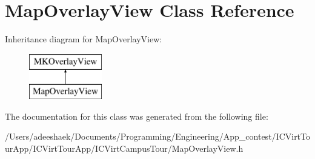 \hypertarget{interface_map_overlay_view}{\section{Map\-Overlay\-View Class Reference}
\label{interface_map_overlay_view}
}
Inheritance diagram for Map\-Overlay\-View\-:\begin{figure}[H]
\begin{center}
\leavevmode
\includegraphics[height=2.000000cm]{interface_map_overlay_view}
\end{center}
\end{figure}


The documentation for this class was generated from the following file\-:\begin{DoxyCompactItemize}
\item 
/\-Users/adeeshaek/\-Documents/\-Programming/\-Engineering/\-App\-\_\-contest/\-I\-C\-Virt\-Tour\-App/\-I\-C\-Virt\-Tour\-App/\-I\-C\-Virt\-Campus\-Tour/Map\-Overlay\-View.\-h\end{DoxyCompactItemize}
